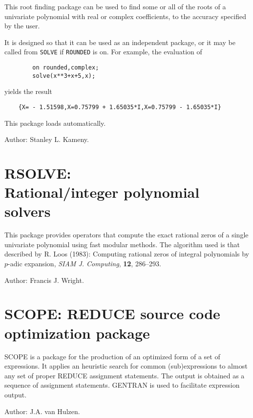 This root finding package can be used to find some or all of the roots of a
univariate polynomial with real or complex coefficients, to the accuracy
specified by the user.

It is designed so that it can be used as an independent package, or it may
be called from {\tt SOLVE} if {\tt ROUNDED} is on. For example,
the evaluation of
\begin{verbatim}
        on rounded,complex;
        solve(x**3+x+5,x);
\end{verbatim}
yields the result
\begin{verbatim}
    {X= - 1.51598,X=0.75799 + 1.65035*I,X=0.75799 - 1.65035*I}
\end{verbatim}

This package loads automatically.

Author: Stanley L. Kameny.


\newpage

\section[RSOLVE: Rational/integer polynomial solvers]%
        {RSOLVE: \protect\\ Rational/integer polynomial solvers}

This package provides operators that compute the exact rational zeros
of a single univariate polynomial using fast modular methods.  The
algorithm used is that described by R. Loos (1983): Computing rational
zeros of integral polynomials by $p$-adic expansion, \textit{SIAM J.
Computing}, \textbf{12}, 286--293.

Author: Francis J. Wright.


\newpage

\section{SCOPE: REDUCE source code optimization package} 
\label{SCOPE}

SCOPE is a package for the production of an optimized form of a set of
expressions.  It applies an heuristic search for common (sub)expressions
to almost any set of proper REDUCE assignment statements.  The
output is obtained as a sequence of assignment statements.  GENTRAN is
used to facilitate expression output.

Author:  J.A. van Hulzen.

